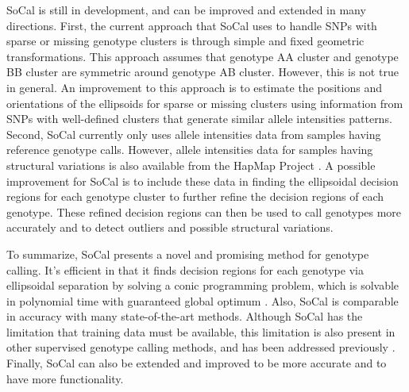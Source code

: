 \documentclass{scrartcl}
\begin{document}
\par
SoCal is still in development, and can be improved and extended in
many directions.
First, the current approach that SoCal uses to handle SNPs with sparse or
missing genotype clusters is through simple and fixed geometric
transformations.
This approach assumes that genotype AA cluster and genotype BB cluster are
symmetric around genotype AB cluster.
However, this is not true in general.
An improvement to this approach is to estimate the positions and orientations
of the ellipsoids for sparse or missing clusters using information from
SNPs with well-defined clusters that generate similar allele
intensities patterns. 
Second, SoCal currently only uses allele intensities data from samples having
reference genotype calls.
However, allele intensities data for samples having structural variations is
also available from the HapMap Project \cite{hapmap2003}.
A possible improvement for SoCal is to include these data in finding the
ellipsoidal decision regions for each genotype cluster to further refine the
decision regions of each genotype.
These refined decision regions can then be used to call genotypes more
accurately and to detect outliers and possible structural variations.

\par
To summarize, SoCal presents a novel and promising method for genotype calling.
It's efficient in that it finds decision regions for each genotype via
ellipsoidal separation by solving a conic programming problem, which is
solvable in polynomial time with guaranteed global optimum \cite{glineur1998}.
Also, SoCal is comparable in accuracy with many state-of-the-art methods.
Although SoCal has the limitation that training data must be available, this
limitation is also present in other supervised genotype calling methods, and
has been addressed previously \cite{carvalho2007}.
Finally, SoCal can also be extended and improved to be more accurate and to
have more functionality.
\end{document}

